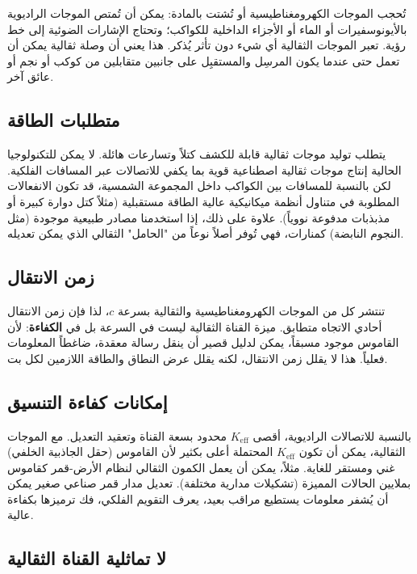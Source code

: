 \documentclass[11pt,a4paper]{article}
\newcommand{\Keff}{K_{\mathrm{eff}}}
\begin{document}
	تُحجب الموجات الكهرومغناطيسية أو تُشتت بالمادة: يمكن أن تُمتص الموجات الراديوية بالأيونوسفيرات أو الماء أو الأجزاء الداخلية للكواكب؛ وتحتاج الإشارات الضوئية إلى خط رؤية. تعبر الموجات الثقالية أي شيء دون تأثر يُذكر. هذا يعني أن وصلة ثقالية يمكن أن تعمل حتى عندما يكون المرسِل والمستقبِل على جانبين متقابلين من كوكب أو نجم أو عائق آخر.
	
	\subsection{متطلبات الطاقة}
	
	يتطلب توليد موجات ثقالية قابلة للكشف كتلاً وتسارعات هائلة. لا يمكن للتكنولوجيا الحالية إنتاج موجات ثقالية اصطناعية قوية بما يكفي للاتصالات عبر المسافات الفلكية. لكن بالنسبة للمسافات بين الكواكب داخل المجموعة الشمسية، قد تكون الانفعالات المطلوبة في متناول أنظمة ميكانيكية عالية الطاقة مستقبلية (مثلاً كتل دوارة كبيرة أو مذبذبات مدفوعة نووياً). علاوة على ذلك، إذا استخدمنا مصادر طبيعية موجودة (مثل النجوم النابضة) كمنارات، فهي تُوفر أصلاً نوعاً من "الحامل" الثقالي الذي يمكن تعديله.
	
	\subsection{زمن الانتقال}
	
	تنتشر كل من الموجات الكهرومغناطيسية والثقالية بسرعة \(c\)، لذا فإن زمن الانتقال أحادي الاتجاه متطابق. ميزة القناة الثقالية ليست في السرعة بل في \textbf{الكفاءة}: لأن القاموس موجود مسبقاً، يمكن لدليل قصير أن ينقل رسالة معقدة، ضاغطاً المعلومات فعلياً. هذا لا يقلل زمن الانتقال، لكنه يقلل عرض النطاق والطاقة اللازمين لكل بت.
	
	\subsection{إمكانات كفاءة التنسيق}
	
	بالنسبة للاتصالات الراديوية، أقصى \(\Keff\) محدود بسعة القناة وتعقيد التعديل. مع الموجات الثقالية، يمكن أن تكون \(\Keff\) المحتملة أعلى بكثير لأن القاموس (حقل الجاذبية الخلفي) غني ومستقر للغاية. مثلاً، يمكن أن يعمل الكمون الثقالي لنظام الأرض-قمر كقاموس بملايين الحالات المميزة (تشكيلات مدارية مختلفة). تعديل مدار قمر صناعي صغير يمكن أن يُشفر معلومات يستطيع مراقب بعيد، يعرف التقويم الفلكي، فك ترميزها بكفاءة عالية.
	
	\subsection{لا تماثلية القناة الثقالية}
	\label{subsec:asymmetry}
	
\end{document}
